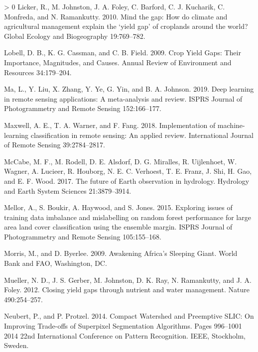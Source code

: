\documentclass[11pt,a4paper]{article}
\newlength{\cslhangindent}
\newenvironment{CSLReferences}[3] %
 {%
  \setlength{\parindent}{0pt}
  \ifodd #1 \everypar{\setlength{\hangindent}{\cslhangindent}}\ignorespaces\fi
  \ifnum #2 > 0
  \setlength{\parskip}{#2\baselineskip}
  \fi
 }%
 {}
\begin{document}
\begin{CSLReferences}{1}{0}
\leavevmode\hypertarget{ref-LickerMindgaphow2010}{}%
Licker, R., M. Johnston, J. A. Foley, C. Barford, C. J. Kucharik, C.
Monfreda, and N. Ramankutty. 2010. Mind the gap: How do climate and
agricultural management explain the {`yield gap'} of croplands around
the world? Global Ecology and Biogeography 19:769--782.

\leavevmode\hypertarget{ref-lobellCropYieldGaps2009}{}%
Lobell, D. B., K. G. Cassman, and C. B. Field. 2009. Crop {Yield Gaps}:
Their {Importance}, {Magnitudes}, and {Causes}. Annual Review of
Environment and Resources 34:179--204.

\leavevmode\hypertarget{ref-maDeepLearningRemote2019}{}%
Ma, L., Y. Liu, X. Zhang, Y. Ye, G. Yin, and B. A. Johnson. 2019. Deep
learning in remote sensing applications: A meta-analysis and review.
ISPRS Journal of Photogrammetry and Remote Sensing 152:166--177.

\leavevmode\hypertarget{ref-MaxwellImplementationmachinelearningclassification2018}{}%
Maxwell, A. E., T. A. Warner, and F. Fang. 2018. Implementation of
machine-learning classification in remote sensing: An applied review.
International Journal of Remote Sensing 39:2784--2817.

\leavevmode\hypertarget{ref-McCabefutureEarthobservation2017}{}%
McCabe, M. F., M. Rodell, D. E. Alsdorf, D. G. Miralles, R. Uijlenhoet,
W. Wagner, A. Lucieer, R. Houborg, N. E. C. Verhoest, T. E. Franz, J.
Shi, H. Gao, and E. F. Wood. 2017. The future of {Earth} observation in
hydrology. Hydrology and Earth System Sciences 21:3879--3914.

\leavevmode\hypertarget{ref-mellorExploringIssuesTraining2015}{}%
Mellor, A., S. Boukir, A. Haywood, and S. Jones. 2015. Exploring issues
of training data imbalance and mislabelling on random forest performance
for large area land cover classification using the ensemble margin.
ISPRS Journal of Photogrammetry and Remote Sensing 105:155--168.

\leavevmode\hypertarget{ref-morrisAwakeningAfricaSleeping2009}{}%
Morris, M., and D. Byerlee. 2009. Awakening {Africa}'s {Sleeping Giant}.
{World Bank and FAO}, {Washington, DC}.

\leavevmode\hypertarget{ref-muellerClosingYieldGaps2012}{}%
Mueller, N. D., J. S. Gerber, M. Johnston, D. K. Ray, N. Ramankutty, and
J. A. Foley. 2012. Closing yield gaps through nutrient and water
management. Nature 490:254--257.

\leavevmode\hypertarget{ref-neubertCompactWatershedPreemptive2014}{}%
Neubert, P., and P. Protzel. 2014. Compact {Watershed} and {Preemptive
SLIC}: On {Improving Trade}-offs of {Superpixel Segmentation
Algorithms}. Pages 996--1001 2014 22nd {International Conference} on
{Pattern Recognition}. {IEEE}, {Stockholm, Sweden}.


\end{CSLReferences}
\end{document}
